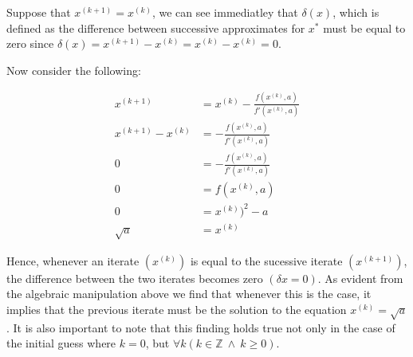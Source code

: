 \documentclass{article}
\begin{document}
\begin{enumerate}
                \vspace{5pt}
                Suppose that $x^{(k+1)} = x^{(k)}$, we can see immediatley that $\delta(x)$,
                which is defined as the difference between successive approximates for $x^*$
                must be equal to zero since
                $\delta(x) = x^{(k+1)} - x^{(k)} = x^{(k)} - x^{(k)} = 0$.

                Now consider the following:

                \begin{align*}
                    x^{(k+1)} &= x^{(k)}-\frac{f(x^{(k)},a)}{f'(x^{(k)},a)}\\
                    x^{(k+1)} - x^{(k)} &= -\frac{f(x^{(k)},a)}{f'(x^{(k)},a)}\\
                    0 &= -\frac{f(x^{(k)},a)}{f'(x^{(k)},a)}\\
                    0 &= f(x^{(k)},a)\\
                    0 &= x^{(k)})^2 - a\\
                    \sqrt{a} &= x^{(k)}
                \end{align*}

                Hence, whenever an iterate $(x^{(k)})$ is equal to the sucessive iterate $(x^{(k+1)})$,
                the difference between the two iterates becomes zero $(\delta x=0)$. As evident from
                the algebraic manipulation above we find that whenever this is the case, it implies that
                the previous iterate must be the solution to the equation $x^{(k)}=\sqrt{a}$.
                It is also important to note that this finding holds true not only in the case of the
                initial guess where $k=0$, but $\forall k(k\in\mathbb{Z}~\land~k\geq 0)$.
    

\end{enumerate}
\end{document}
